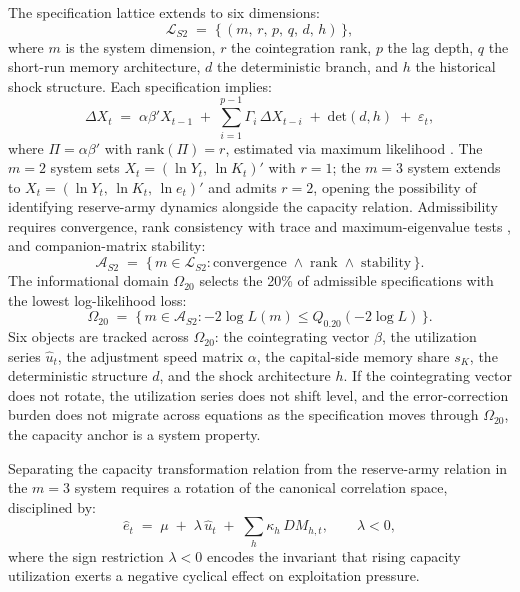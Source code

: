 \documentclass[11pt,a4paper]{article}
\begin{document}
The specification lattice extends to six dimensions:
%
\begin{equation}
	\label{eq:S2_lattice}
	\mathcal{L}_{S2} \;=\;
	\bigl\{\,(m,\, r,\, p,\, q,\, d,\, h)\,\bigr\},
\end{equation}
%
where $m$ is the system dimension, $r$ the cointegration rank, $p$ the lag
depth, $q$ the short-run memory architecture, $d$ the deterministic branch,
and $h$ the historical shock structure. Each specification implies:
%
\begin{equation}
	\label{eq:S2_vecm}
	\Delta X_t \;=\; \alpha\beta' X_{t-1}
	\;+\; \sum_{i=1}^{p-1} \Gamma_i \,\Delta X_{t-i}
	\;+\; \text{det}(d,h)
	\;+\; \varepsilon_t,
\end{equation}
%
where $\Pi = \alpha\beta'$ with $\mathrm{rank}(\Pi) = r$, estimated via
maximum likelihood \citep{Stigler2020}. The $m = 2$ system sets
$X_t = (\ln Y_t,\, \ln K_t)'$ with $r = 1$; the $m = 3$ system extends to
$X_t = (\ln Y_t,\, \ln K_t,\, \ln e_t)'$ and admits $r = 2$, opening the
possibility of identifying reserve-army dynamics alongside the capacity
relation. Admissibility requires convergence, rank consistency with trace
and maximum-eigenvalue tests \citep{Johansen1991}, and companion-matrix
stability:
%
\begin{equation}
	\label{eq:S2_admissible}
	\mathcal{A}_{S2} \;=\;
	\bigl\{\, m \in \mathcal{L}_{S2} :
	\text{convergence} \;\wedge\;
	\text{rank} \;\wedge\;
	\text{stability}
	\,\bigr\}.
\end{equation}
%
The informational domain $\Omega_{20}$ selects the 20\% of admissible
specifications with the lowest log-likelihood loss:
%
\begin{equation}
	\label{eq:S2_omega20}
	\Omega_{20} \;=\;
	\bigl\{\, m \in \mathcal{A}_{S2} :
	{-2\log L}(m) \leq Q_{0.20}({-2\log L})
	\,\bigr\}.
\end{equation}
%
Six objects are tracked across $\Omega_{20}$: the cointegrating vector
$\beta$, the utilization series $\widehat{u}_t$, the adjustment speed
matrix $\alpha$, the capital-side memory share $s_K$, the deterministic
structure $d$, and the shock architecture $h$. If the cointegrating vector
does not rotate, the utilization series does not shift level, and the
error-correction burden does not migrate across equations as the
specification moves through $\Omega_{20}$, the capacity anchor is a system
property.

Separating the capacity transformation relation from the reserve-army
relation in the $m = 3$ system requires a rotation of the canonical
correlation space, disciplined by:
%
\begin{equation}
	\label{eq:S2_rotation}
	\hat{e}_t \;=\; \mu \;+\; \lambda\,\hat{u}_t
	\;+\; \sum_{h} \kappa_h \, DM_{h,t},
	\qquad \lambda < 0,
\end{equation}
%
where the sign restriction $\lambda < 0$ encodes the invariant that rising
capacity utilization exerts a negative cyclical effect on exploitation
pressure.
\end{document}
